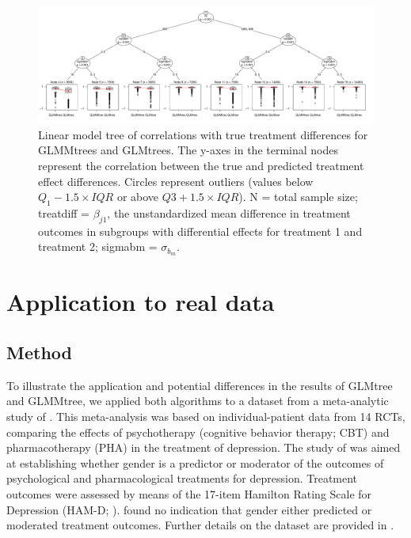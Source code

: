\documentclass[nobf,doc]{apa}
\begin{document}
\begin{figure}
	\includegraphics[width=20cm]{correlation_mob_maxdepth=4.pdf}
	\caption{Linear model tree of correlations with true treatment differences for GLMMtrees and GLMtrees. The y-axes in the terminal nodes represent the correlation between the true and predicted treatment effect differences. Circles represent outliers (values below $Q_1 - 1.5 \times IQR$ or above $Q3 + 1.5 \times IQR$). N = total sample size; treatdiff = $\beta_{j1}$, the unstandardized mean difference in treatment outcomes in subgroups with differential effects for treatment 1 and treatment 2; sigmabm = $\sigma_{b_m}$.}
	\label{fig:correlationtree}
\end{figure}




\section{Application to real data}

\subsection{Method}
To illustrate the application and potential differences in the results of GLMtree and GLMMtree, we applied both algorithms to a dataset from a meta-analytic study of . This meta-analysis was based on individual-patient data from 14 RCTs, comparing the effects of psychotherapy (cognitive behavior therapy; CBT) and pharmacotherapy (PHA) in the treatment of depression. The study of  was aimed at establishing whether gender is a predictor or moderator of the outcomes of psychological and pharmacological treatments for depression. Treatment outcomes were assessed by means of the 17-item Hamilton Rating Scale for Depression (HAM-D; ).  found no indication that gender either predicted or moderated treatment outcomes. Further details on the dataset are provided in .
\end{document}
